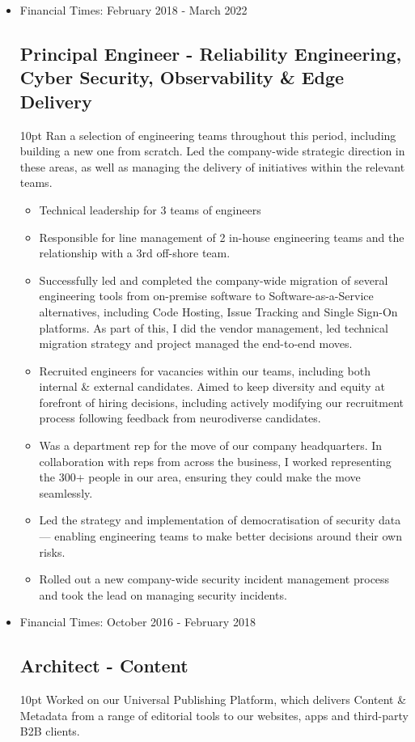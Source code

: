 \documentclass[a4paper]{article}
\newenvironment{detail}{\begin{adjustwidth}{10pt}{}}{\end{adjustwidth}}
\begin{document}
\begin{itemize}
\item Financial Times: February 2018 - March 2022
\subsection*{Principal Engineer - Reliability Engineering, Cyber Security, Observability \& Edge Delivery}
\begin{detail}
Ran a selection of engineering teams throughout this period, including building a new one from scratch.  Led the company-wide strategic direction in these areas, as well as managing the delivery of initiatives within the relevant teams.

\begin{itemize}
	\item Technical leadership for 3 teams of engineers
	\item Responsible for line management of 2 in-house engineering teams and the relationship with a 3rd off-shore team.
	\item Successfully led and completed the company-wide migration of several engineering tools from on-premise software to Software-as-a-Service alternatives, including Code Hosting, Issue Tracking and Single Sign-On platforms.  As part of this, I did the vendor management, led technical migration strategy and project managed the end-to-end moves.
	\item Recruited engineers for vacancies within our teams, including both internal \& external candidates.  Aimed to keep diversity and equity at forefront of hiring decisions, including actively modifying our recruitment process following feedback from neurodiverse candidates.
	\item Was a department rep for the move of our company headquarters.  In collaboration with reps from across the business, I worked representing the 300+ people in our area, ensuring they could make the move seamlessly.
	\item Led the strategy and implementation of democratisation of security data — enabling engineering teams to make better decisions around their own risks.
	\item Rolled out a new company-wide security incident management process and took the lead on managing security incidents.
\end{itemize}
\end{detail}

\item Financial Times: October 2016 - February 2018
\subsection*{Architect - Content}
\begin{detail}
Worked on our Universal Publishing Platform, which delivers Content \& Metadata from a range of editorial tools to our websites, apps and third-party B2B clients.


\end{detail}
\end{itemize}
\end{document}
